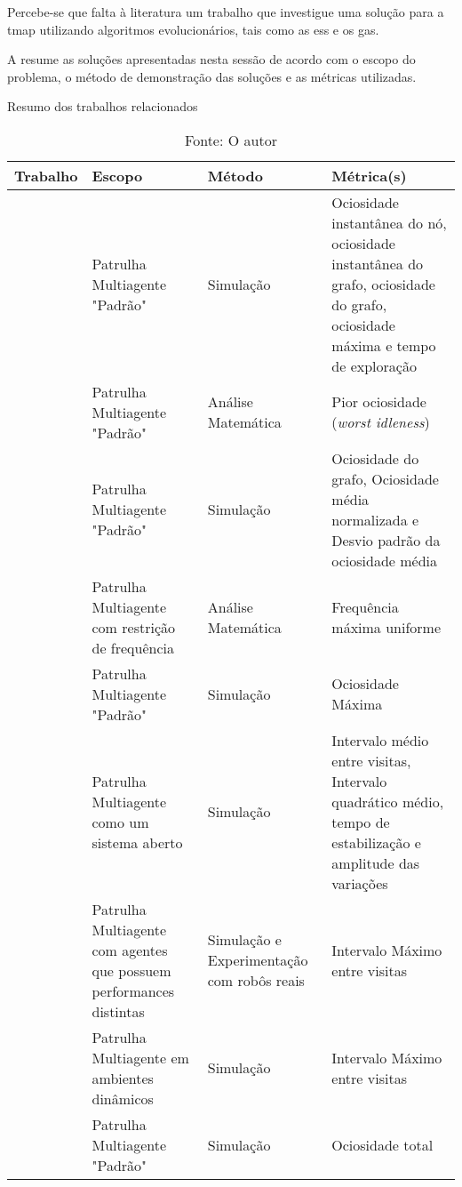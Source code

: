 Percebe-se que falta à literatura um trabalho que investigue uma solução para a 
\ac{tmap} utilizando algoritmos evolucionários, tais como as \acp{es} e os 
\acp{ga}.

A  resume as soluções apresentadas nesta sessão de 
acordo com o escopo do problema, o método de demonstração das soluções e as 
métricas utilizadas.

\begin{table}[tp]
	\centering
	\caption{Resumo dos trabalhos relacionados}
	\label{tbl:comp_background}
	\begin{tabularx}{\linewidth}{|X|X|X|X|}
		\hline
		\textbf{Trabalho} & \textbf{Escopo} & \textbf{Método} & \textbf{Métrica(s)} \\
		\hline
		\citep{Machado:2002:MPE:1765317.1765332} & Patrulha Multiagente "Padrão" & Simulação & Ociosidade instantânea do nó, ociosidade instantânea do grafo, ociosidade do grafo, ociosidade máxima e tempo de exploração \\
		\hline
		\citep{Chevaleyre:2004:TAM:1018411.1019013} & Patrulha Multiagente "Padrão" & Análise Matemática & Pior ociosidade (\textit{worst idleness}) \\
		\hline
		\citep{Almeida:2004:AAI} & Patrulha Multiagente "Padrão" & Simulação & Ociosidade do grafo, Ociosidade média normalizada e Desvio padrão da ociosidade média \\
		\hline
		\citep{4209122} & Patrulha Multiagente com restrição de frequência & Análise Matemática & Frequência máxima uniforme \\
		\hline
		\citep{4630897} & Patrulha Multiagente "Padrão" & Simulação & Ociosidade Máxima \\
		\hline
		\citep{6495145} & Patrulha Multiagente como um sistema aberto & Simulação & Intervalo médio entre visitas, Intervalo quadrático médio, tempo de estabilização e amplitude das variações \\
		\hline
		\citep{Pippin:2013:PBT:2480362.2480378} & Patrulha Multiagente com agentes que possuem performances distintas & Simulação e Experimentação com robôs reais & Intervalo Máximo entre visitas \\
		\hline
		\citep{6615158} & Patrulha Multiagente em ambientes dinâmicos & Simulação & Intervalo Máximo entre visitas \\
		\hline
		\citep{hernandez2013game} & Patrulha Multiagente "Padrão" & Simulação & Ociosidade total \\
		\hline
	\end{tabularx}
	\caption*{Fonte: O autor}
\end{table}